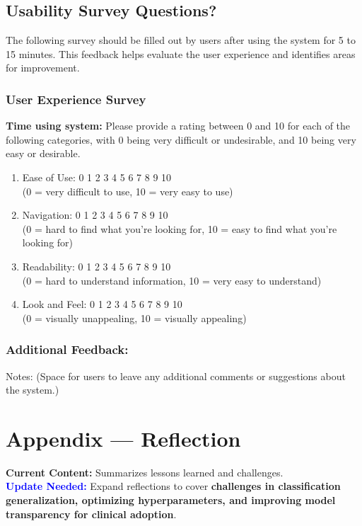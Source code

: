 \documentclass[12pt, titlepage]{article}
\begin{document}
\subsection{Usability Survey Questions?}

The following survey should be filled out by users after using the system for 5 to 15 minutes. This feedback helps evaluate the user experience and identifies areas for improvement.

\subsubsection{User Experience Survey}

\textbf{Time using system:}
Please provide a rating between 0 and 10 for each of the following categories, with 0 being very difficult or undesirable, and 10 being very easy or desirable.
\begin{enumerate}
  \item Ease of Use: 0 1 2 3 4 5 6 7 8 9 10 \\
    (0 = very difficult to use, 10 = very easy to use)
  \item Navigation: 0 1 2 3 4 5 6 7 8 9 10 \\
    (0 = hard to find what you're looking for, 10 = easy to find what you're looking for)
  \item Readability: 0 1 2 3 4 5 6 7 8 9 10 \\
    (0 = hard to understand information, 10 = very easy to understand)
  \item Look and Feel: 0 1 2 3 4 5 6 7 8 9 10 \\
    (0 = visually unappealing, 10 = visually appealing)
\end{enumerate}

\subsubsection{Additional Feedback:}
Notes: (Space for users to leave any additional comments or suggestions about the system.)

\newpage{}
\section*{Appendix --- Reflection}

\textbf{Current Content:} Summarizes lessons learned and challenges. \\
\textbf{\textcolor{blue}{Update Needed:}} Expand reflections to cover \textbf{challenges in classification generalization, optimizing hyperparameters, and improving model transparency for clinical adoption}.
\end{document}
